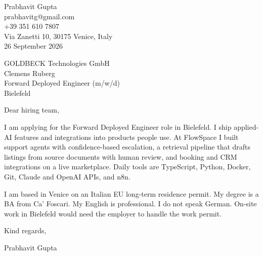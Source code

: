 \documentclass[11pt]{article}
\begin{document}
Prabhavit Gupta\\
prabhavitg@gmail.com\\
+39 351 610 7807\\
Via Zanetti 10, 30175 Venice, Italy\\
26 September 2026

GOLDBECK Technologies GmbH\\
Clemens Ruberg\\
Forward Deployed Engineer (m/w/d)\\
Bielefeld

Dear hiring team,

I am applying for the Forward Deployed Engineer role in Bielefeld. I ship applied-AI features and integrations into products people use. At FlowSpace I built support agents with confidence-based escalation, a retrieval pipeline that drafts listings from source documents with human review, and booking and CRM integrations on a live marketplace. Daily tools are TypeScript, Python, Docker, Git, Claude and OpenAI APIs, and n8n.

I am based in Venice on an Italian EU long-term residence permit. My degree is a BA from Ca' Foscari. My English is professional. I do not speak German. On-site work in Bielefeld would need the employer to handle the work permit.

Kind regards,

Prabhavit Gupta
\end{document}
